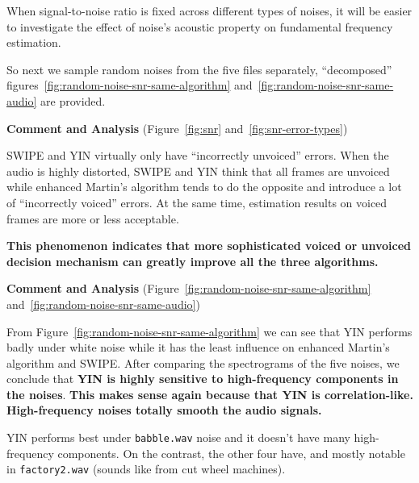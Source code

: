 \documentclass[11pt,a4paper]{report}
\begin{document}
When signal-to-noise ratio is fixed across different types of noises, it will be easier to investigate the effect of noise's acoustic property on fundamental frequency estimation.

So next we sample random noises from the five files separately, \enquote{decomposed} figures~\ref{fig:random-noise-snr-same-algorithm} and~\ref{fig:random-noise-snr-same-audio} are provided.

\begin{mdframed}
\textbf{Comment and Analysis} (Figure~\ref{fig:snr} and~\ref{fig:snr-error-types})

\bigskip

SWIPE and YIN virtually only have \enquote{incorrectly unvoiced} errors.
When the audio is highly distorted, SWIPE and YIN think that all frames are unvoiced while enhanced Martin's algorithm tends to do the opposite and introduce a lot of \enquote{incorrectly voiced} errors.
At the same time, estimation results on voiced frames are more or less acceptable.

\textbf{This phenomenon indicates that more sophisticated voiced or unvoiced decision mechanism can greatly improve all the three algorithms.}
\end{mdframed}

\begin{mdframed}
\textbf{Comment and Analysis} (Figure~\ref{fig:random-noise-snr-same-algorithm} and~\ref{fig:random-noise-snr-same-audio})

From Figure~\ref{fig:random-noise-snr-same-algorithm} we can see that YIN performs badly under white noise while it has the least influence on enhanced Martin's algorithm and SWIPE\@.
After comparing the spectrograms of the five noises, we conclude that \textbf{YIN is highly sensitive to high-frequency components in the noises}.
\textbf{This makes sense again because that YIN is correlation-like.
High-frequency noises totally smooth the audio signals.}

YIN performs best under \texttt{babble.wav} noise and it doesn't have many high-frequency components.
On the contrast, the other four have, and mostly notable in \texttt{factory2.wav} (sounds like from cut wheel machines).
\end{mdframed}
\end{document}
